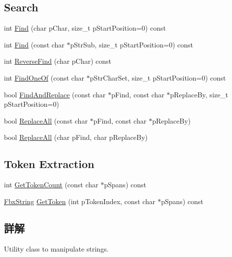 \subsection*{Search}
\begin{DoxyCompactItemize}
\item 
int \hyperlink{class_fbx_string_a6089c51dcf07542e8ac5401a2883d81d}{Find} (char p\+Char, size\+\_\+t p\+Start\+Position=0) const
\item 
int \hyperlink{class_fbx_string_a1e8f4ebd8ffd89a77b093071cad9bd2c}{Find} (const char $\ast$p\+Str\+Sub, size\+\_\+t p\+Start\+Position=0) const
\item 
int \hyperlink{class_fbx_string_ace5a9c1f1e86a44c5ee70ff7fa70a4a2}{Reverse\+Find} (char p\+Char) const
\item 
int \hyperlink{class_fbx_string_a9bca9f3f617dbb8f00969d0554f3204e}{Find\+One\+Of} (const char $\ast$p\+Str\+Char\+Set, size\+\_\+t p\+Start\+Position=0) const
\item 
bool \hyperlink{class_fbx_string_a5ace1d727a05548db34a3bfb79e336d1}{Find\+And\+Replace} (const char $\ast$p\+Find, const char $\ast$p\+Replace\+By, size\+\_\+t p\+Start\+Position=0)
\item 
bool \hyperlink{class_fbx_string_af4d66e188f7c62145125a1414c36f627}{Replace\+All} (const char $\ast$p\+Find, const char $\ast$p\+Replace\+By)
\item 
bool \hyperlink{class_fbx_string_ad6b80193fddfef2c2c42117c7891322e}{Replace\+All} (char p\+Find, char p\+Replace\+By)
\end{DoxyCompactItemize}
\subsection*{Token Extraction}
\begin{DoxyCompactItemize}
\item 
int \hyperlink{class_fbx_string_a6ac1ce41710e19cf01a3db4f82fecbe0}{Get\+Token\+Count} (const char $\ast$p\+Spans) const
\item 
\hyperlink{class_fbx_string}{Fbx\+String} \hyperlink{class_fbx_string_a1836040bac11746d73e7c665216e0292}{Get\+Token} (int p\+Token\+Index, const char $\ast$p\+Spans) const
\end{DoxyCompactItemize}


\subsection{詳解}
Utility class to manipulate strings. 

